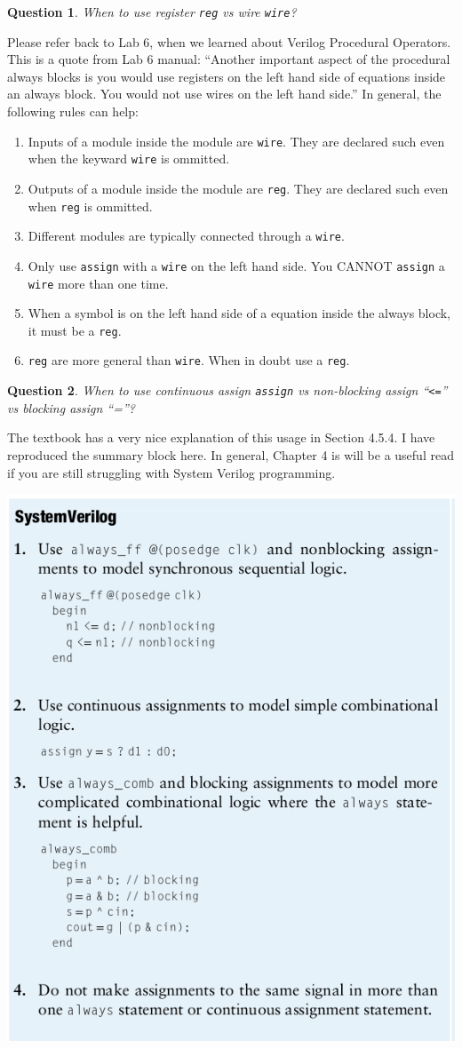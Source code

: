\documentclass{article}
\newtheorem{question}{Question}
\begin{document}
\begin{question}
  When to use register \lstinline[style=verilog-style]{reg} vs wire \lstinline[style=verilog-style]{wire}?
\end{question}
Please refer back to Lab 6, when we learned about Verilog Procedural Operators.
This is a quote from Lab 6 manual: ``Another important aspect of the procedural
always blocks is you would use registers on the left hand side of equations
inside an always block. You would not use wires on the left hand side.'' In
general, the following rules can help:
\begin{enumerate}
  \item Inputs of a module inside the module are
    \lstinline[style=verilog-style]{wire}. They are declared such even when the
    keyward \lstinline[style=verilog-style]{wire} is ommitted.
  \item Outputs of a module inside the module are
    \lstinline[style=verilog-style]{reg}. They are declared such even when
    \lstinline[style=verilog-style]{reg} is ommitted.
  \item Different modules are typically connected through a \lstinline[style=verilog-style]{wire}.
  \item Only use \lstinline[style=verilog-style]{assign} with a \lstinline[style=verilog-style]{wire} on the left hand side. You CANNOT
    \lstinline[style=verilog-style]{assign} a
    \lstinline[style=verilog-style]{wire} more than one time.
  \item When a symbol is on the left hand side of a equation inside the always
    block, it must be a \lstinline[style=verilog-style]{reg}.
  \item \lstinline[style=verilog-style]{reg} are more general than
    \lstinline[style=verilog-style]{wire}. When in doubt use a \lstinline[style=verilog-style]{reg}.
\end{enumerate}

\begin{question}
  When to use continuous assign \lstinline[style=verilog-style]{assign} vs non-blocking assign ``\lstinline{<=}'' vs
  blocking assign ``=''? 
\end{question}
The textbook has a very nice explanation of this usage
in Section 4.5.4. I have reproduced the summary block here. In general, Chapter 4 is will be a useful read if you are
still struggling with System Verilog programming.

\includegraphics[width=0.4\linewidth]{./blocking-vs-non-blocking-assignment.png}
\end{document}
